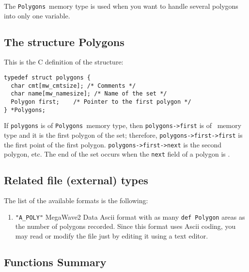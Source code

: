 \label{curves-polygons_polygons}
\def\polygons{{\tt Polygons}}
\index{structure!\polygons}

The \polygons\ memory type is used when you want to handle several polygons
into only one variable. 

\subsection{The structure Polygons}
\label{curves-polygons_polygons_structure}

This is the C definition of the structure:
{\small
\begin{verbatim}
typedef struct polygons {
  char cmt[mw_cmtsize]; /* Comments */
  char name[mw_namesize]; /* Name of the set */
  Polygon first;    /* Pointer to the first polygon */
} *Polygons;
\end{verbatim}
}

If \verb+polygons+ is of \polygons\ memory type, then \verb+polygons->first+ is
of \polygon\ memory type and it is the first polygon of the set; 
therefore, \verb+polygons->first->first+ is the first point of the first
polygon.
\verb+polygons->first->next+ is the second polygon, etc.
The end of the set occurs when the \verb+next+ field of a polygon is
\Null.

\subsection{Related file (external) types}
\label{curves-polygons_polygons-file_type}

The list of the available formats is the following:
\begin{enumerate}
\item \verb+"A_POLY"+ 
 MegaWave2 Data Ascii format with as many \verb+def Polygon+ areas as the number of polygons recorded.
Since this format uses Ascii coding, you may read or modify the file just by
editing it using a text editor.
\end{enumerate}

\subsection{Functions Summary}
\label{curves-polygons_polygons_function}

